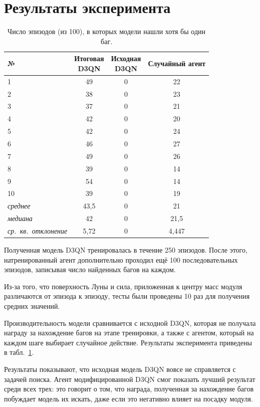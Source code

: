\section{Результаты эксперимента}

\begin{table}[ht]
	\centering
	\caption{Число эпизодов (из 100), в которых модели нашли хотя бы один баг.}
	\begin{tabular}{ l c c c }
		\hline
		№ & \makecell{Итоговая\\D3QN} & \makecell{Исходная\\D3QN} & Случайный агент \\
		\hline
		1 & 49 & 0 & 22\\
		2 & 38 & 0 & 23\\
		3 & 37 & 0 & 21\\
		4 & 42 & 0 & 20\\
		5 & 42 & 0 & 24\\
		6 & 46 & 0 & 27\\
		7 & 49 & 0 & 26\\
		8 & 39 & 0 & 14\\
		9 & 54 & 0 & 14\\
		10 & 39 & 0 & 19\\
		\hline
		\textit{среднее} & 43,5 & 0 & 21 \\
		\textit{медиана} & 42 & 0 & 21,5 \\
		\textit{ср.~кв.~отклонение} & 5,72 & 0 & 4,447 \\
		\hline
	\end{tabular}
	\label{tab:results}
\end{table}

Полученная модель D3QN тренировалась в течение 250 эпизодов. После этого, натренированный агент дополнительно проходил ещё 100 последовательных эпизодов, записывая число найденных багов на каждом. 

Из-за того, что поверхность Луны и сила, приложенная к центру масс модуля различаются от эпизода к эпизоду, тесты были проведены 10 раз для получения средних значений.

Производительность модели сравнивается с исходной D3QN, которая не получала награду за нахождение багов на этапе тренировки, а также с агентом, который на каждом шаге выбирает случайное действие. Результаты эксперимента приведены в табл.~\ref{tab:results}. 

Результаты показывают, что исходная модель D3QN вовсе не справляется с задачей поиска. Агент модифицированной D3QN смог показать лучший результат среди всех трех: это говорит о том, что награда, полученная за нахождение багов побуждает модель их искать, даже если это негативно влияет на посадку модуля.

